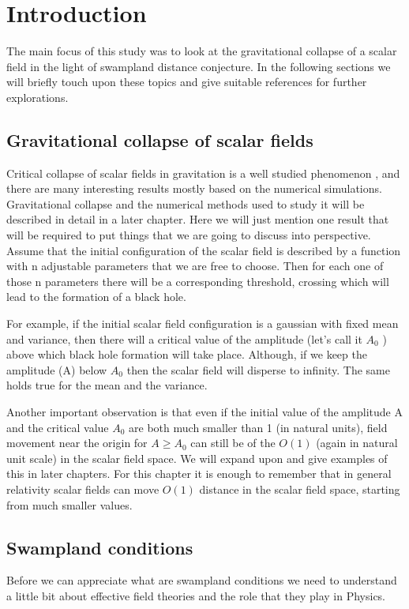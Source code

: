 \chapter{Introduction}

The main focus of this study was to look at the gravitational collapse of a scalar field in the light of swampland distance conjecture. In the following sections we will briefly touch upon these topics and give suitable references for further explorations.

\section{Gravitational collapse of scalar fields}


Critical collapse of scalar fields in gravitation is a well studied phenomenon \citep{Gundlach:2007gc}, and there are many interesting results mostly based on the numerical simulations.
Gravitational collapse and the numerical methods used to study it will be described in detail in a later chapter. Here we will just mention one result that will be required to put things that we are going to discuss into perspective.
Assume that the initial configuration of the scalar field is described by a function with n adjustable parameters that we are free to choose. Then for each one of those n parameters there will be a corresponding threshold, crossing which will lead to the formation of a black hole.

For example, if the initial scalar field configuration is a gaussian with fixed mean and variance, then there will a critical value of the amplitude (let’s call it $A_0$ ) above which black hole formation will take place. Although, if we keep the amplitude (A) below $A_0$ then the scalar field will disperse to infinity. The same holds true for the mean and the variance.

Another important observation is that even if the initial value of the amplitude A and the critical value $A_0$ are both much smaller than 1 (in natural units), field movement near the origin for $A \geq A_0$ can still be of the $O(1)$ (again in natural unit scale) in the scalar field space. We will expand upon and give examples of this in later chapters.
For this chapter it is enough to remember that in general relativity scalar fields can move $O(1)$ distance in the scalar field space, starting from much smaller values.

\section{Swampland conditions}
Before we can appreciate what are swampland conditions we need to understand a little bit about effective field theories and the role that they play in Physics.

